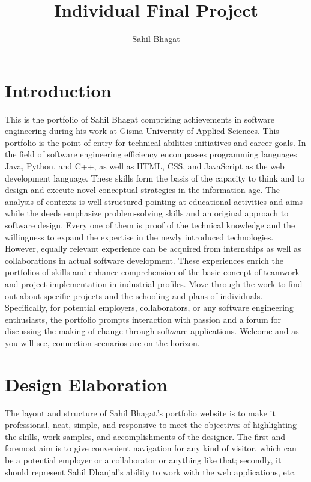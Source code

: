 \documentclass{article}
\title{Individual Final Project}
\author{Sahil Bhagat}
\date{}
\begin{document}
\maketitle

\tableofcontents

\section{Introduction}
This is the portfolio of Sahil Bhagat comprising achievements in software engineering during his work at Gisma University of Applied Sciences. This portfolio is the point of entry for technical abilities initiatives and career goals. 
In the field of software engineering efficiency encompasses programming languages Java, Python, and C++, as well as HTML, CSS, and JavaScript as the web development language. These skills form the basis of the capacity to think and to design and execute novel conceptual strategies in the information age. 
The analysis of contexts is well-structured pointing at educational activities and aims while the deeds emphasize problem-solving skills and an original approach to software design. Every one of them is proof of the technical knowledge and the willingness to expand the expertise in the newly introduced technologies. 
However, equally relevant experience can be acquired from internships as well as collaborations in actual software development. These experiences enrich the portfolios of skills and enhance comprehension of the basic concept of teamwork and project implementation in industrial profiles. 
Move through the work to find out about specific projects and the schooling and plans of individuals. Specifically, for potential employers, collaborators, or any software engineering enthusiasts, the portfolio prompts interaction with passion and a forum for discussing the making of change through software applications. Welcome and as you will see, connection scenarios are on the horizon. 

\section{Design Elaboration}
The layout and structure of Sahil Bhagat’s portfolio website is to make it professional, neat, simple, and responsive to meet the objectives of highlighting the skills, work samples, and accomplishments of the designer. The first and foremost aim is to give convenient navigation for any kind of visitor, which can be a potential employer or a collaborator or anything like that; secondly, it should represent Sahil Dhanjal’s ability to work with the web applications, etc. 
\end{document}
